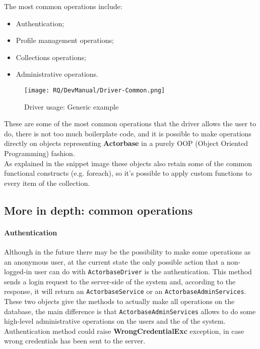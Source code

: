 \documentclass{scalatekids-article}
\begin{document}
The most common operations include:
\begin{itemize}
\item Authentication;
\item Profile management operations;
\item Collections operations;
\item Administrative operations.
\end{itemize}

\begin{figure}[H]
  \begin{center}
    \texttt{[image: RQ/DevManual/Driver-Common.png]}
    \caption{Driver usage: Generic example}
  \end{center}
\end{figure}

These are some of the most common operations that the driver allows the user to do,
there is not too much boilerplate code, and it is possible
to make operations directly on objects representing \textbf{Actorbase}
 in a purely OOP (Object Oriented Programming) fashion.\\
As explained in the snippet image these objects also retain some of the common functional constructs (e.g.
foreach), so it's possible to apply custom functions to every item of the
collection.

\subsection{More in depth: common operations}

\paragraph{Authentication}

Although in the future there may be the possibility to make some
operations as an anonymous user, at the current state the only possible action
that a non-logged-in user can do with \verb=ActorbaseDriver= is the authentication.
This method sends a login request to the server-side of the system and, according
to the response, it will return an \verb=ActorbaseService= or an
\verb=ActorbaseAdminServices=. These two objects give the methods to
actually make all operations on the database, the main difference is that
\verb=ActorbaseAdminServices= allows to do some high-level
administrative operations on the users and the  of the system.\\
Authentication method could raise \textbf{WrongCredentialExc} exception, in case
wrong credentials has been sent to the server.
\end{document}
